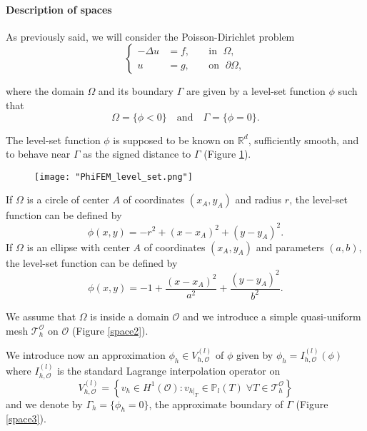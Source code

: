 \paragraph{Description of spaces} \label{FEMs.PhiFEM.Pres.Spaces}

As previously said, we will consider the Poisson-Dirichlet problem
\begin{equation}
	\left\{
	\begin{aligned}
		-\Delta u &= f, \; &&\text{in } \; \Omega, \\
		u&=g, \; &&\text{on } \; \partial\Omega,
	\end{aligned}
	\right.
	\label{eq.Poisson}
\end{equation}

where the domain $\Omega$ and its boundary $\Gamma$ are given by a level-set function $\phi$ such that
\begin{equation*}
	\Omega=\{\phi < 0\} \quad \text{and} \quad \Gamma=\{\phi = 0\}.
\end{equation*}

The level-set function $\phi$ is supposed to be known on $\mathbb{R}^d$, sufficiently smooth, and to behave near $\Gamma$ as the signed distance to $\Gamma$ (Figure \ref{space1}). 

\begin{figure}[H]
	\centering
	\texttt{[image: "PhiFEM\_level\_set.png"]}
	\label{space1}
\end{figure}

\begin{Example}
	If $\Omega$ is a circle of center $A$ of coordinates $(x_A,y_A)$ and radius $r$, the level-set function can be defined by
	\begin{equation*}
		\phi(x,y)=-r^2+(x-x_A)^2+(y-y_A)^2.
	\end{equation*}
	If $\Omega$ is an ellipse with center $A$ of coordinates $(x_A,y_A)$ and parameters $(a,b)$, the level-set function can be defined by
	\begin{equation*}
		\phi(x,y)=-1+\frac{(x-x_A)^2}{a^2}+\frac{(y-y_A)^2}{b^2}.
	\end{equation*}
\end{Example}

We assume that $\Omega$ is inside a domain $\mathcal{O}$ and we introduce a simple quasi-uniform mesh $\mathcal{T}_h^\mathcal{O}$ on $\mathcal{O}$ (Figure \ref{space2}).
 
We introduce now an approximation $\phi_h\in V_{h,\mathcal{O}}^{(l)}$ of $\phi$ given by $\phi_h=I_{h,\mathcal{O}}^{(l)}(\phi)$ where $I_{h,\mathcal{O}}^{(l)}$ is the standard Lagrange interpolation operator on
\begin{equation*}
	V_{h,\mathcal{O}}^{(l)}=\left\{v_h\in H^1(\mathcal{O}):v_{h|_T}\in\mathbb{P}_l(T) \;  \forall T\in\mathcal{T}_h^\mathcal{O}\right\}
\end{equation*}
and we denote by $\Gamma_h=\{\phi_h=0\}$, the approximate boundary of $\Gamma$ (Figure \ref{space3}).

